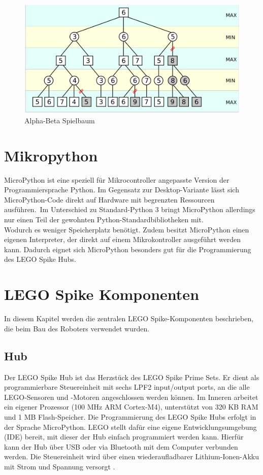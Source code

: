 \begin{figure}[H]
	\centering
	\includegraphics[width=1\linewidth]{images/alpha_beta}
	\caption[Alpha-Beta Spielbaum Quelle: \autocite{wikimediaABpruning}]{Alpha-Beta Spielbaum}
	\label{fig:alphabeta}
\end{figure}



\section{Mikropython}
MicroPython ist eine speziell für Mikrocontroller angepasste Version der Programmiersprache Python. Im Gegensatz zur Desktop-Variante lässt sich MicroPython-Code direkt auf Hardware mit begrenzten Ressourcen ausführen\autocite{energy_responsiveness2023}\autocite{Plauska2023}.\
Im Unterschied zu Standard-Python 3 bringt MicroPython allerdings nur einen Teil der gewohnten Python-Standardbibliotheken mit.\\ Wodurch es weniger Speicherplatz benötigt.
Zudem besitzt MicroPython einen eigenen Interpreter, der direkt auf einem Mikrokontroller ausgeführt werden kann.
Dadurch eignet sich MicroPython besonders gut für die Programmierung des LEGO Spike Hubs\autocite{bell2024micropython}.



\section{LEGO Spike Komponenten}
In diesem Kapitel werden die zentralen LEGO Spike-Komponenten beschrieben, die beim Bau des Roboters verwendet wurden. 

\subsection{Hub}
Der LEGO Spike Hub ist das Herzstück des LEGO Spike Prime Sets. Er dient als programmierbare Steuereinheit mit sechs LPF2 input/output ports, an die alle LEGO-Sensoren und -Motoren angeschlossen werden können. Im Inneren arbeitet ein eigener Prozessor (100 MHz ARM Cortex-M4), unterstützt von 320 KB RAM und 1 MB Flash-Speicher. Die Programmierung des LEGO Spike Hubs erfolgt in der Sprache MicroPython. LEGO stellt dafür eine eigene Entwicklungsumgebung (IDE) bereit, mit dieser der Hub einfach programmiert werden kann. Hierfür kann der Hub über USB oder via Bluetooth mit dem Computer verbunden werden. Die Steuereinheit wird über einen  wiederaufladbarer Lithium-Ionen-Akku mit Strom und Spannung versorgt \autocite{lego2020techniclargehub}.

